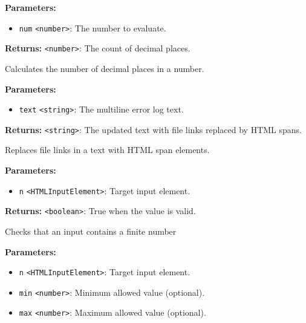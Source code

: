 \documentclass[12pt,a4paper]{article}
\begin{document}
\noindent \textbf{Parameters:}
\begin{itemize}
  \item \texttt{num} \texttt{<number>}: The number to evaluate.
\end{itemize}

\noindent \textbf{Returns:} \texttt{<number>}: The count of decimal places.

\noindent Calculates the number of decimal places in a number.

\vspace{5mm}
\noindent {}


\noindent \textbf{Parameters:}
\begin{itemize}
  \item \texttt{text} \texttt{<string>}: The multiline error log text.
\end{itemize}

\noindent \textbf{Returns:} \texttt{<string>}: The updated text with file links replaced by HTML spans.

\noindent Replaces file links in a text with HTML span elements.

\vspace{5mm}
\noindent {}


\noindent \textbf{Parameters:}
\begin{itemize}
  \item \texttt{n} \texttt{<HTMLInputElement>}: Target input element.
\end{itemize}

\noindent \textbf{Returns:} \texttt{<boolean>}: True when the value is valid.

\noindent Checks that an input contains a finite number

\vspace{5mm}
\noindent {}


\noindent \textbf{Parameters:}
\begin{itemize}
  \item \texttt{n} \texttt{<HTMLInputElement>}: Target input element.
  \item \texttt{min} \texttt{<number>}: Minimum allowed value (optional).
  \item \texttt{max} \texttt{<number>}: Maximum allowed value (optional).
\end{itemize}
\end{document}
